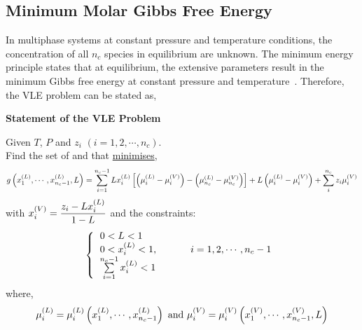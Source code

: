 \subsection{Minimum Molar Gibbs Free Energy}\label{Chapter:ThermodynamicFormulation:Section:MinimumGibbsEnergy}
In multiphase systems at constant pressure and temperature conditions, the concentration of all $n_{c}$ species in equilibrium are unknown. The minimum energy principle states that at equilibrium, the extensive parameters result in the minimum Gibbs free energy at constant pressure and temperature~\citep{Callen_Book}. Therefore, the VLE problem can be stated as,

\begin{algorithm}
\begin{shaded}
   \begin{center}
     {\bf Statement of the VLE Problem}
   \end{center}

   Given $T$, $P$ and $z_{i}$ $\left(i=1,2,\cdots,n_{c}\right)$. \\
   Find the set of  and  that \underline{minimises},   \begin{displaymath}
      g\left(\mfr[x]{1}{L},\cdots,\mfr[x]{n_{c}-1}{L}, L\right) = \summation_{i=1}^{n_{c}-1}L\mfr[x]{i}{L}\left[\left(\mfr[\mu]{i}{L}-\mfr[\mu]{i}{V}\right)-\left(\mfr[\mu]{n_{c}}{L}-\mfr[\mu]{n_{c}}{V}\right)\right] + L\left(\mfr[\mu]{i}{L}-\mfr[\mu]{i}{V}\right) + \summation_{i}^{n_{c}}z_{i}\mfr[\mu]{i}{V} 
   \end{displaymath}
   with $\mfr[x]{i}{V} = \frc{z_{i}-L\mfr[x]{i}{L}}{1-L}$ and the constraints:
\[ 
\left\{
  \begin{tabular}{l}
  $0 < L < 1$ \\
  $0 < \mfr[x]{i}{L} < 1$, \hspace{1cm} $i=1,2,\cdots,n_{c}-1$\\
  $\summation_{i=1}^{n_{c}-1}\mfr[x]{i}{L} < 1$\\ 
  \end{tabular}
\right.
\]
where,
\begin{displaymath}
   \mfr[\mu]{i}{L}=\mfr[\mu]{i}{L}\left(\mfr[x]{1}{L},\cdots,\mfr[x]{n_{c}-1}{L}\right)\text{ and }\mfr[\mu]{i}{V}=\mfr[\mu]{i}{V}\left(\mfr[x]{1}{V},\cdots,\mfr[x]{n_{c}-1}{V}, L\right)
\end{displaymath}

\end{shaded}
\label{VLE_Problem:Algorithm}\caption{Vapour-liquid equibrium problem.}
\end{algorithm}

